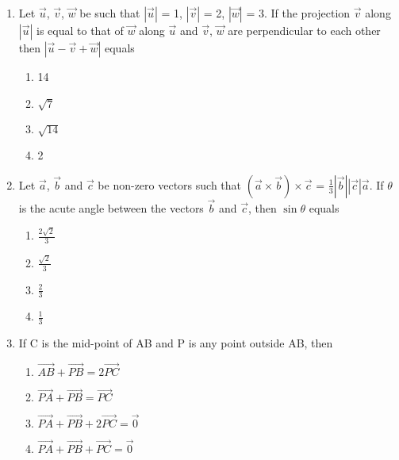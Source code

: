 \begin{enumerate}[label=\arabic*.,ref=\thesubsection.\theenumi]
\item Let $\overrightarrow{u}$, $\overrightarrow{v}$, $\overrightarrow{w}$ be such that $|\overrightarrow{u}|$ = 1, 
$|\overrightarrow{v}|$ = 2, $|\overrightarrow{w}|$ = 3. If the projection $\overrightarrow{v}$ along 
$|\overrightarrow{u}|$ is equal to that of $\overrightarrow{w}$ along $\overrightarrow{u}$ and $\overrightarrow{v}$, 
$\overrightarrow{w}$ are perpendicular to each other then $|\overrightarrow{u} - \overrightarrow{v} + \overrightarrow{w}|$ equals
\begin{enumerate}
\item 14
\item $\sqrt{7}$
\item $\sqrt{14}$
\item 2
\end{enumerate}

\item Let $\overrightarrow{a}$, $\overrightarrow{b}$ and $\overrightarrow{c}$ be non-zero vectors such that $(\overrightarrow{a} \times \overrightarrow{b}) \times \overrightarrow{c}$ = $\frac{1}{3}|\overrightarrow{b}||\overrightarrow{c}|\overrightarrow{a}$. If $\theta$ is the acute angle between the vectors $\overrightarrow{b}$ and $\overrightarrow{c}$, then $\sin\theta$ equals
\begin{enumerate}
\item $\frac{2\sqrt{2}}{3}$
\item $\frac{\sqrt{2}}{3}$
\item $\frac{2}{3}$
\item $\frac{1}{3}$
\end{enumerate}

\item If C is the mid-point of AB and P is any point outside AB, then 
\begin{enumerate}
\item $\overrightarrow{AB} + \overrightarrow{PB} = 2\overrightarrow{PC}$
\item $\overrightarrow{PA} + \overrightarrow{PB} = \overrightarrow{PC}$
\item $\overrightarrow{PA} + \overrightarrow{PB} + 2\overrightarrow{PC} = \overrightarrow{0}$
\item $\overrightarrow{PA} + \overrightarrow{PB} + \overrightarrow{PC} = \overrightarrow{0}$
\end{enumerate}


\end{enumerate}
